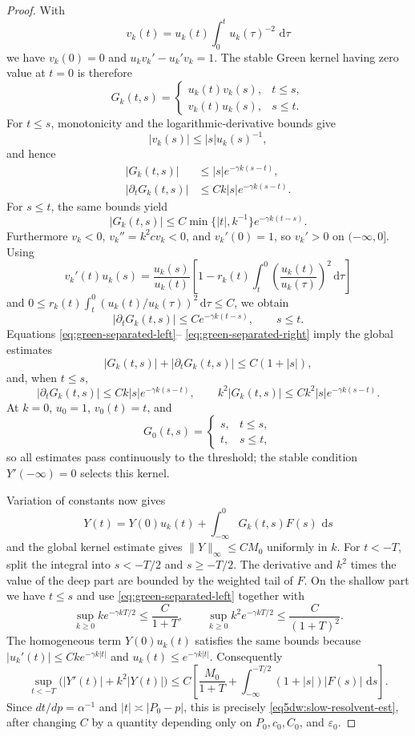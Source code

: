 \documentclass[11pt,reqno]{amsart}
\numberwithin{equation}{section}
\newcommand{\dd}{\,\mathrm{d}}
\theoremstyle{definition}
\theoremstyle{remark}
\renewcommand{\t }{\tau }
\begin{document}
\begin{proof}
With
\[
 v_k(t)=u_k(t)\int_0^t u_k(\tau)^{-2}\,\dd\tau
\]
we have $v_k(0)=0$ and
$u_kv_k'-u_k'v_k=1$.  The stable Green kernel having zero value at
$t=0$ is therefore
\[
 G_k(t,s)=
 \begin{cases}
 u_k(t)v_k(s),&t\le s,\\
 v_k(t)u_k(s),&s\le t.
 \end{cases}
\]
For $t\le s$, monotonicity and the logarithmic-derivative bounds give
\[
 |v_k(s)|
 \le |s|u_k(s)^{-1},
\]
and hence
\begin{equation}\label{eq:green-separated-left}
 \begin{aligned}
 |G_k(t,s)|&\le |s|e^{-\gamma k(s-t)},\\
 |\partial_tG_k(t,s)|
 &\le Ck|s|e^{-\gamma k(s-t)}.
 \end{aligned}
\end{equation}
For $s\le t$, the same bounds yield
\[
 |G_k(t,s)|
 \le C\min\{|t|,k^{-1}\}e^{-\gamma k(t-s)}.
\]
Furthermore $v_k<0$, $v_k''=k^2cv_k<0$, and $v_k'(0)=1$, so
$v_k'>0$ on $(-\infty,0]$.  Using
\[
 v_k'(t)u_k(s)
 =\frac{u_k(s)}{u_k(t)}\left[
 1-r_k(t)\int_t^0
 \left(\frac{u_k(t)}{u_k(\tau)}\right)^2\dd\tau
 \right]
\]
and $0\le r_k(t)\int_t^0(u_k(t)/u_k(\tau))^2\dd\tau\le C$, we obtain
\begin{equation}\label{eq:green-separated-right}
 |\partial_tG_k(t,s)|
 \le Ce^{-\gamma k(t-s)},\qquad s\le t.
\end{equation}
Equations \eqref{eq:green-separated-left}--
\eqref{eq:green-separated-right} imply the global estimates
\[
 |G_k(t,s)|+|\partial_tG_k(t,s)|\le C(1+|s|),
\]
and, when $t\le s$,
\[
 |\partial_tG_k(t,s)|\le Ck|s|e^{-\gamma k(s-t)},\qquad
 k^2|G_k(t,s)|\le Ck^2|s|e^{-\gamma k(s-t)}.
\]
At $k=0$, $u_0=1$, $v_0(t)=t$, and
\[
 G_0(t,s)=\begin{cases}s,&t\le s,\\t,&s\le t,\end{cases}
\]
so all estimates pass continuously to the threshold; the stable
condition $Y'(-\infty)=0$ selects this kernel.

Variation of constants now gives
\[
 Y(t)=Y(0)u_k(t)+\int_{-\infty}^0G_k(t,s)F(s)\,\dd s
\]
and the global kernel estimate gives $\|Y\|_\infty\le CM_0$
uniformly in $k$.  For $t<-T$, split the integral into
$s<-T/2$ and $s\ge-T/2$.  The derivative and $k^2$ times the value of
the deep part are bounded by the weighted tail of $F$.  On the
shallow part we have $t\le s$ and use
\eqref{eq:green-separated-left} together with
\[
 \sup_{k\ge0}ke^{-\gamma kT/2}\le\frac{C}{1+T},\qquad
 \sup_{k\ge0}k^2e^{-\gamma kT/2}\le\frac{C}{(1+T)^2}.
\]
The homogeneous term $Y(0)u_k(t)$ satisfies the same bounds because
$|u_k'(t)|\le Cke^{-\gamma k|t|}$ and
$u_k(t)\le e^{-\gamma k|t|}$.  Consequently
\[
 \sup_{t<-T}\bigl(|Y'(t)|+k^2|Y(t)|\bigr)
 \le C\left[
  \frac{M_0}{1+T}
  +\int_{-\infty}^{-T/2}(1+|s|)|F(s)|\,\dd s
 \right].
\]
Since $dt/dp=\alpha^{-1}$ and $|t|\asymp|P_0-p|$, this is precisely
\eqref{eq5dw:slow-resolvent-est}, after changing $C$ by a quantity
depending only on $P_0,c_0,C_0$, and $\varepsilon_0$.
\end{proof}
\end{document}
